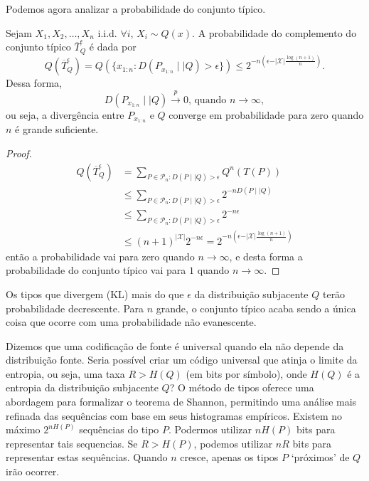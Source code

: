 Podemos agora analizar a probabilidade do conjunto típico.
\begin{theorem}
  Sejam $X_1, X_2, \ldots, X_n$ i.i.d. $\forall i$, $X_i \sim Q(x)$. A probabilidade do complemento
  do conjunto típico $\overline{T}^{\epsilon}_Q$ é dada por
  \begin{equation}
    Q(\overline{T}^{\epsilon}_Q) = Q( \{ x_{1:n} : D(P_{x_{1:n}} \mid\mid Q) > \epsilon  \} ) \leq 2^{-n (\epsilon - \vert \mathcal{X} \vert \frac{\log (n+1)}{n})} .
  \end{equation}
  Dessa forma,
  \begin{equation}
    D(P_{x_{1:n}} \mid\mid Q) \xrightarrow{p} 0 \text{, quando } n \rightarrow \infty ,
  \end{equation}
  ou seja, a divergência entre $P_{x_{1:n}}$ e $Q$ converge em probabilidade para zero quando $n$ é grande suficiente.
  \end{theorem}
  \begin{proof}
  \begin{subequations}
  \begin{align}
  Q(\overline{T}^{\epsilon}_Q) &= \sum_{P \in \mathcal{P}_n : D(P \mid\mid Q) > \epsilon} Q^n (T(P)) \\
        &\leq \sum_{P \in \mathcal{P}_n : D(P \mid\mid Q) > \epsilon} 2^{-n D(P\mid\mid Q)} \\
        &\leq \sum_{P \in \mathcal{P}_n : D(P \mid\mid Q) > \epsilon} 2^{-n \epsilon} \\
        &\leq (n+1)^{\vert \mathcal{X}  \vert} 2^{-n \epsilon} = 2^{-n \left( \epsilon - \vert \mathcal{X} \vert \frac{\log (n+1)}{n}  \right)}
  \end{align}
  \end{subequations}
  então a probabilidade vai para zero quando $n \rightarrow \infty$, e desta forma a probabilidade do conjunto típico vai para $1$ quando $n \rightarrow \infty$.
  \end{proof}
Os tipos que divergem (KL) mais do que $\epsilon$ da distribuição subjacente $Q$ terão probabilidade decrescente.
Para $n$ grande, o conjunto típico acaba sendo a única coisa que ocorre com uma probabilidade não evanescente.









Dizemos que uma codificação de fonte é universal quando ela não depende da distribuição fonte.
Seria possível criar um código universal que atinja o limite da entropia, ou seja, uma taxa $R>H(Q)$
(em bits por símbolo), onde $H(Q)$ é a entropia da distribuição subjacente $Q$?
O método de tipos oferece uma abordagem para formalizar o teorema de Shannon, 
permitindo uma análise mais refinada das sequências com base em seus histogramas empíricos.
Existem no máximo $2^{nH(P)}$ sequências do tipo $P$. Podermos utilizar $nH(P)$ bits para
representar tais sequencias. Se $R > H(P)$, podemos utilizar $nR$ bits para representar estas sequências.
Quando $n$ cresce, apenas os tipos $P$ `próximos' de $Q$ irão ocorrer.

